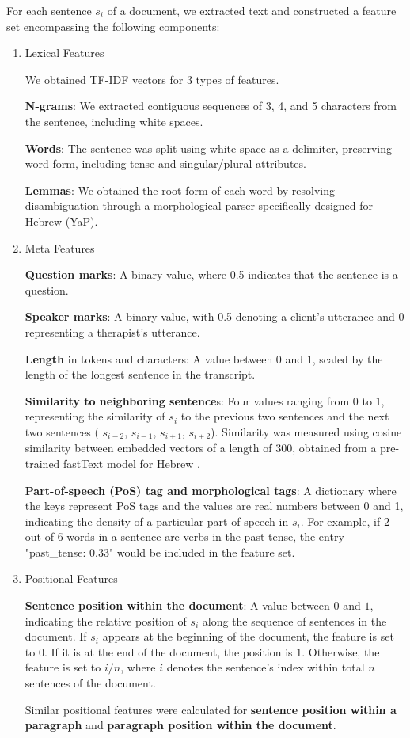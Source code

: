 \documentclass[preprint,12pt]{elsarticle}
\begin{document}
For each sentence $s_{i}$ of a document, we extracted text and constructed a feature set encompassing the following components:
\begin{enumerate}
   \item Lexical Features

We obtained TF-IDF  vectors  \cite{grossman2002information} for $3$ types of features.

\textbf{N-grams}: We extracted contiguous sequences of 3, 4, and 5 characters from the sentence, including white spaces.

\textbf{Words}: The sentence was split using white space as a delimiter, preserving word form, including tense and singular/plural attributes.

\textbf{Lemmas}: We obtained the root form of each word by resolving disambiguation through a morphological parser specifically designed for Hebrew (YaP)\cite{moretsarfatycoling2016}.

\item Meta Features

\textbf{Question marks}: A binary value, where 0.5 indicates that the sentence is a question.

\textbf{Speaker marks}: A binary value, with 0.5 denoting a client's utterance and 0 representing a therapist's utterance.

\textbf{Length }in tokens and characters: A value between 0 and 1, scaled by the length of the longest sentence in the transcript.

\textbf{Similarity to neighboring sentence}s: Four values ranging from $0$ to $1$, representing the similarity of $s_{i}$ to the previous two sentences and the next two sentences ( $s_{i-2}$, $s_{i-1}$,  $s_{i+1}$,  $s_{i+2}$). Similarity was measured using cosine similarity between embedded vectors of a length of 300, obtained from a pre-trained fastText model for Hebrew \cite{grave2018learning}.

\textbf{Part-of-speech (PoS) tag and morphological tags}: A dictionary where the keys represent PoS tags and the values are real numbers between 0 and 1, indicating the density of a particular part-of-speech in $s_{i}$. For example, if $2$ out of $6$ words in a sentence are verbs in the past tense, the entry "past\_tense: $0.33$" would be included in the feature set.

\item Positional Features

\textbf{Sentence position within the document}: A value between $0$ and $1$, indicating the relative position of $s_{i}$ along the sequence of sentences in the document. If $s_{i}$ appears at the beginning of the document, the feature is set to $0$. If it is at the end of the document, the position is $1$. Otherwise, the feature is set to  $i/n$, where $i$ denotes the sentence's index within total $n$ sentences of the document. 

Similar positional features were calculated for \textbf{sentence position within a paragraph} and \textbf{paragraph position within the document}.
\end{enumerate}
\end{document}
